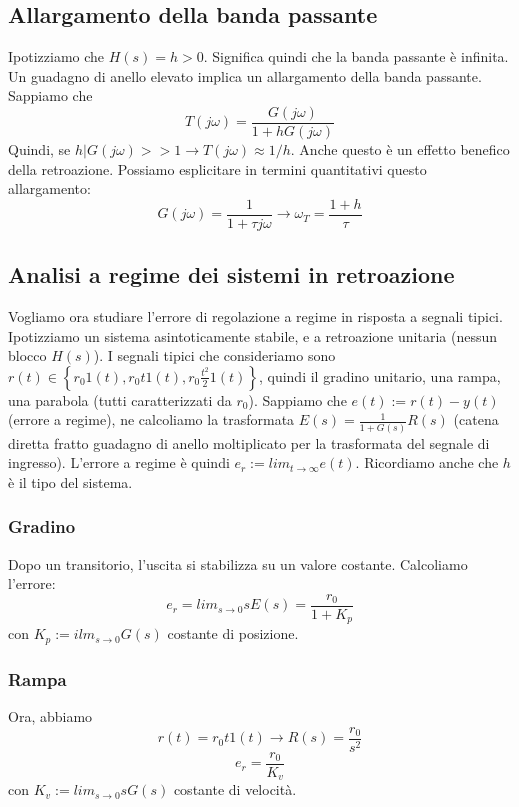 \documentclass[11pt]{article}
\begin{document}
\subsection{Allargamento della banda passante}
Ipotizziamo che $H(s) = h>0$. Significa quindi che la banda passante è infinita. Un guadagno di anello elevato implica un allargamento della banda passante. Sappiamo che \begin{displaymath}
    T(j\omega) = \frac{G(j\omega)}{1+hG(j\omega)}
\end{displaymath}
Quindi, se $h|G(j\omega) >> 1 \rightarrow T(j\omega) \approx 1/h$. 
Anche questo è un effetto benefico della retroazione. Possiamo esplicitare in termini quantitativi questo allargamento:
\begin{displaymath}
    G(j\omega)=\frac{1}{1+\tau j \omega} \rightarrow \omega_T = \frac{1+h}{\tau}
\end{displaymath}
\subsection{Analisi a regime dei sistemi in retroazione}
Vogliamo ora studiare l'errore di regolazione a regime in risposta a segnali tipici. Ipotizziamo un sistema asintoticamente stabile, e a retroazione unitaria (nessun blocco $H(s)$). I segnali tipici che consideriamo sono $r(t) \in \left\{r_0 1(t), r_0t1(t), r_0\frac{t^2}{2}1(t)\right\}$, quindi il gradino unitario, una rampa, una parabola (tutti caratterizzati da $r_0$). Sappiamo che $e(t) := r(t)-y(t)$ (errore a regime), ne calcoliamo la trasformata $E(s)=\frac{1}{1+G(s)}R(s)$ (catena diretta fratto guadagno di anello moltiplicato per la trasformata del segnale di ingresso). L'errore a regime è quindi $e_r := lim_{t\rightarrow\infty} e(t)$. Ricordiamo anche che $h$ è il tipo del sistema. 
\subsubsection{Gradino}
Dopo un transitorio, l'uscita si stabilizza su un valore costante. Calcoliamo l'errore:
\begin{displaymath}
    e_r = lim_{s\rightarrow0} sE(s) = \frac{r_0}{1+K_p}
\end{displaymath}
con $K_p := ilm_{s\rightarrow0}G(s)$ costante di posizione.
\subsubsection{Rampa}
Ora, abbiamo 
\begin{displaymath}
    r(t) = r_0 t1(t) \rightarrow R(s) = \frac{r_0}{s^2}
\end{displaymath}
\begin{displaymath}
    e_r = \frac{r_0}{K_v}
\end{displaymath}
con $K_v := lim_{s\rightarrow0}sG(s)$ costante di velocità.
\end{document}
